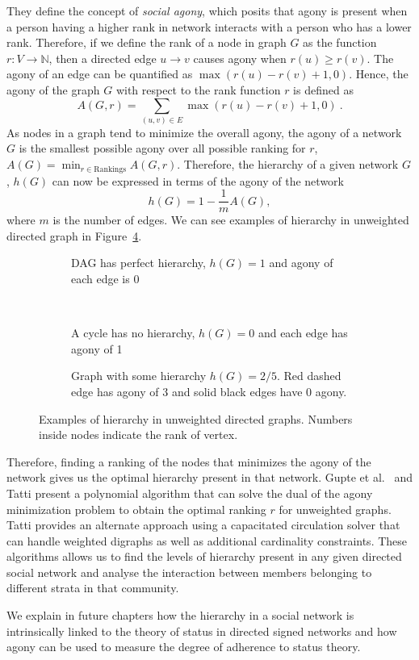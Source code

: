 They define the concept of \textit{social agony}, which posits that agony is present when a person having a higher rank in network interacts with a person who has a lower rank.
Therefore, if we define the rank of a node in graph $G$ as the function $r:V \rightarrow \mathbb{N}$, then a directed edge $u \rightarrow v$ causes agony when $r(u)\geq r(v)$.
The agony of an edge can be quantified as $\max(r(u)-r(v)+1,0)$.
Hence, the agony of the graph $G$ with respect to the rank function $r$ is defined as 
\[A(G,r) =  \sum_{(u,v)\in E} \max(r(u)-r(v)+1,0) ~.\]
As nodes in a graph tend to minimize the overall agony, the agony of a network $G$ is the smallest possible agony over all possible ranking for $r$, $A(G) = \min_{r\in \text{Rankings}}A(G,r)$.
Therefore, the hierarchy of a given network $G$, $h(G)$ can now be expressed in terms of the agony of the network \[h(G)=1-\frac{1}{m}A(G),\] where $m$ is the number of edges.
We can see examples of hierarchy in unweighted directed graph in Figure~\ref{fig:hierarchy}.

 
\begin{figure}[!ht]
    \centering
    \begin{subfigure}[t]{0.5\textwidth}
        \centering
        
        \caption{DAG has perfect hierarchy, $h(G)=1$ and agony of each edge is 0}
        \label{fig:dag}
    \end{subfigure}
    \\[5ex]
    \begin{subfigure}[t]{0.48\textwidth}
        \centering
        
        \caption{A cycle has no hierarchy, $h(G)=0$ and each edge has agony of 1}
        \label{fig:cycle}
    \end{subfigure}
    \hspace{4mm}%
    \begin{subfigure}[t]{0.48\textwidth}
        \centering
        
        \caption{Graph with some hierarchy $h(G)=2/5$. Red dashed edge has agony of 3 and solid black edges have 0 agony.  }
        \label{fig:some-hierarchy}
    \end{subfigure}
    \caption{Examples of hierarchy in unweighted directed graphs. Numbers inside nodes indicate the rank of vertex.}
    \label{fig:hierarchy} 
\end{figure}

Therefore, finding a ranking of the nodes that minimizes the agony of the network gives us the optimal hierarchy present in that network.
Gupte et al.\ \cite{gupte2011finding} and Tatti \cite{tatti2014faster} present a polynomial algorithm that can solve the dual of the agony minimization problem to obtain the optimal ranking $r$ for unweighted graphs.
Tatti \cite{tatti2017tiers} provides an alternate approach using a capacitated circulation solver that can handle weighted digraphs as well as additional cardinality constraints.
These algorithms allows us to find the levels of hierarchy present in any given directed social network and analyse the interaction between members belonging to different strata in that community.

We explain in future chapters how the hierarchy in a social network is intrinsically linked to the theory of status in directed signed networks and how agony can be used to measure the degree of adherence to status theory.




